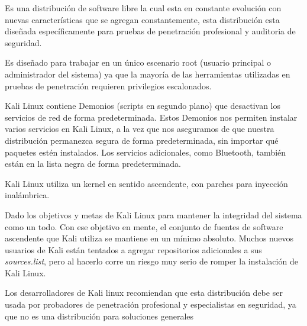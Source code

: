 \begin{multicols}{2}
Es una distribución de software libre la cual esta en constante evolución con nuevas características que se agregan constantemente, esta distribución esta diseñada específicamente para pruebas de penetración profesional y auditoria de seguridad.\\



Es diseñado para trabajar en un único escenario root (usuario principal o administrador del sistema) ya que la mayoría de las herramientas utilizadas en pruebas de penetración requieren privilegios escalonados.\\


Kali Linux contiene Demonios (scripts en segundo plano) que desactivan los servicios de red de forma predeterminada. Estos Demonios nos permiten instalar varios servicios en Kali Linux, a la vez que nos aseguramos de que nuestra distribución permanezca segura de forma predeterminada, sin importar qué paquetes estén instalados. Los servicios adicionales, como Bluetooth, también están en la lista negra de forma predeterminada.\\


Kali Linux utiliza un kernel en sentido ascendente, con parches para inyección inalámbrica.\\


Dado los objetivos y metas de Kali Linux para mantener la integridad del sistema como un todo. Con ese objetivo en mente, el conjunto de fuentes de software ascendente que Kali utiliza se mantiene en un mínimo absoluto. Muchos nuevos usuarios de Kali están tentados a agregar repositorios adicionales a sus \textit{sources.list}, pero al hacerlo corre un riesgo muy serio de romper la instalación de Kali Linux.\\


Los desarrolladores de Kali linux recomiendan que esta distribución debe ser usada por probadores de penetración profesional y especialistas en seguridad, ya que no es una distribución para soluciones generales


\end{multicols}
